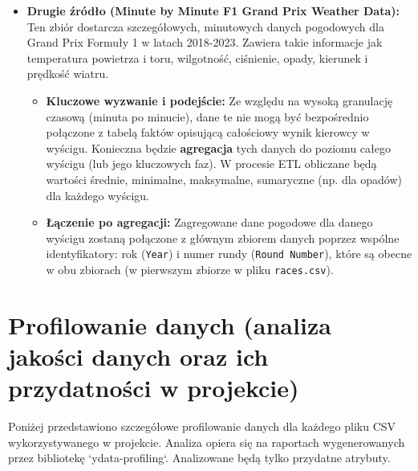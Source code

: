\documentclass[a4paper,12pt]{article}
\begin{document}
\begin{itemize}[label=\textbullet, leftmargin=*]
  \item \textbf{Drugie źródło (Minute by Minute F1 Grand Prix Weather Data):} Ten zbiór dostarcza szczegółowych, minutowych danych pogodowych dla Grand Prix Formuły 1 w latach 2018-2023. Zawiera takie informacje jak temperatura powietrza i toru, wilgotność, ciśnienie, opady, kierunek i prędkość wiatru.
        \begin{itemize}[label=\textendash, leftmargin=1em]
          \item \textbf{Kluczowe wyzwanie i podejście:} Ze względu na wysoką granulację czasową (minuta po minucie), dane te nie mogą być bezpośrednio połączone z tabelą faktów opisującą całościowy wynik kierowcy w wyścigu. Konieczna będzie \textbf{agregacja} tych danych do poziomu całego wyścigu (lub jego kluczowych faz). W procesie ETL obliczane będą wartości średnie, minimalne, maksymalne, sumaryczne (np. dla opadów) dla każdego wyścigu.
          \item \textbf{Łączenie po agregacji:} Zagregowane dane pogodowe dla danego wyścigu zostaną połączone z głównym zbiorem danych poprzez wspólne identyfikatory: rok (\texttt{Year}) i numer rundy (\texttt{Round Number}), które są obecne w obu zbiorach (w pierwszym zbiorze w pliku \texttt{races.csv}).
        \end{itemize}
\end{itemize}

\section{Profilowanie danych (analiza jakości danych oraz ich przydatności w projekcie)}
\label{sec:profilowanie_danych_final}
Poniżej przedstawiono szczegółowe profilowanie danych dla każdego pliku CSV wykorzystywanego w projekcie. Analiza opiera się na raportach wygenerowanych przez bibliotekę `ydata-profiling`. Analizowane będą tylko przydatne atrybuty.
\end{document}
